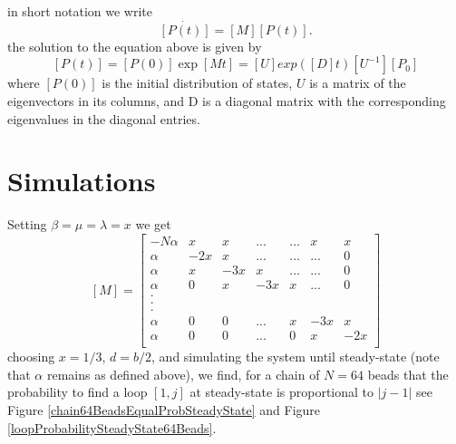 \documentclass[12pt]{article}
\begin{document}
in short notation we write 
\begin{equation*}
\dot{\left[P(t)\right]}=\left[M\right]\left[ P(t)\right]. 
\end{equation*}
the solution to the equation above is given by 
\begin{equation*}
\left[P(t)\right]=\left[P(0)\right]\exp{\left[ Mt\right]}=\left[U\right]exp(\left[D\right]t)\left[U^{-1}\right]\left[P_0\right]
\end{equation*}
where $\left[P(0)\right]$ is the initial distribution of states, $U$ is a matrix of the eigenvectors in its columns, and D is a diagonal matrix with the corresponding  eigenvalues in the diagonal entries.

\section{Simulations}\label{section_simulations}
Setting $\beta=\mu=\lambda=x$ we get 
\begin{equation*}
\left[M\right]=
\left[\begin{matrix}
-N\alpha & x   & x   & ... &... & x & x \\
\alpha   & -2x & x   & ... &... &...& 0 \\
\alpha   & x   & -3x & x   &... &...& 0 \\
\alpha   & 0   & x   & -3x & x  &...& 0 \\
.\\
.\\
.\\
\alpha   & 0   & 0   &...  & x  &-3x& x \\
\alpha   & 0   & 0   &...  &  0 & x &-2x\\
\end{matrix}\right] 
\end{equation*}
choosing $x=1/3$, $d=b/2$, and simulating the system until steady-state (note that $\alpha$ remains as defined above), we find, for a chain of $N=64$ beads that the probability to find a loop $[1,j]$ at steady-state is proportional to $|j-1|$ see Figure \ref{chain64BeadsEqualProbSteadyState} and Figure \ref{loopProbabilitySteadyState64Beads}.
\end{document}
